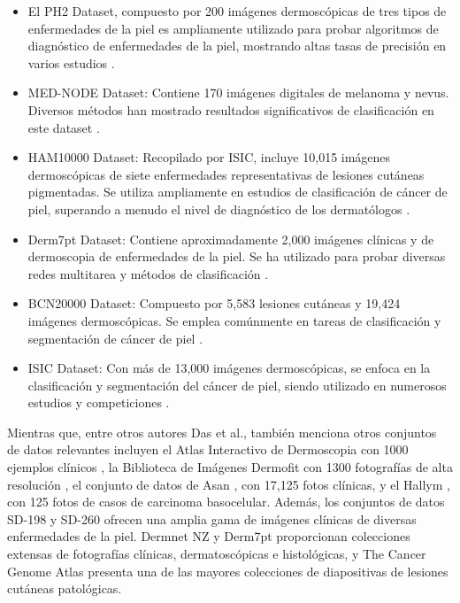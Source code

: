 \begin{itemize}
    \item El PH2 Dataset, compuesto por 200 imágenes dermoscópicas de tres tipos de enfermedades de la piel es ampliamente utilizado para probar algoritmos de diagnóstico de enfermedades de la piel, mostrando altas tasas de precisión en varios estudios . 
    \item MED-NODE Dataset: Contiene 170 imágenes digitales de melanoma y nevus. Diversos métodos han mostrado resultados significativos de clasificación en este dataset .
    \item HAM10000 Dataset: Recopilado por ISIC, incluye 10,015 imágenes dermoscópicas de siete enfermedades representativas de lesiones cutáneas pigmentadas. Se utiliza ampliamente en estudios de clasificación de cáncer de piel, superando a menudo el nivel de diagnóstico de los dermatólogos .
    \item Derm7pt Dataset: Contiene aproximadamente 2,000 imágenes clínicas y de dermoscopia de enfermedades de la piel. Se ha utilizado para probar diversas redes multitarea y métodos de clasificación .
    \item BCN20000 Dataset: Compuesto por 5,583 lesiones cutáneas y 19,424 imágenes dermoscópicas. Se emplea comúnmente en tareas de clasificación y segmentación de cáncer de piel .
    \item ISIC Dataset: Con más de 13,000 imágenes dermoscópicas, se enfoca en la clasificación y segmentación del cáncer de piel, siendo utilizado en numerosos estudios y competiciones .
\end{itemize}

Mientras que, entre otros autores Das et al.,  también menciona otros conjuntos de datos relevantes incluyen el Atlas Interactivo de Dermoscopia con 1000 ejemplos clínicos , la Biblioteca de Imágenes Dermofit con 1300 fotografías de alta resolución , el conjunto de datos de Asan , con 17,125 fotos clínicas, y el Hallym , con 125 fotos de casos de carcinoma basocelular. Además, los conjuntos de datos SD-198 y SD-260  ofrecen una amplia gama de imágenes clínicas de diversas enfermedades de la piel. Dermnet NZ y Derm7pt  proporcionan colecciones extensas de fotografías clínicas, dermatoscópicas e histológicas, y The Cancer Genome Atlas  presenta una de las mayores colecciones de diapositivas de lesiones cutáneas patológicas.

